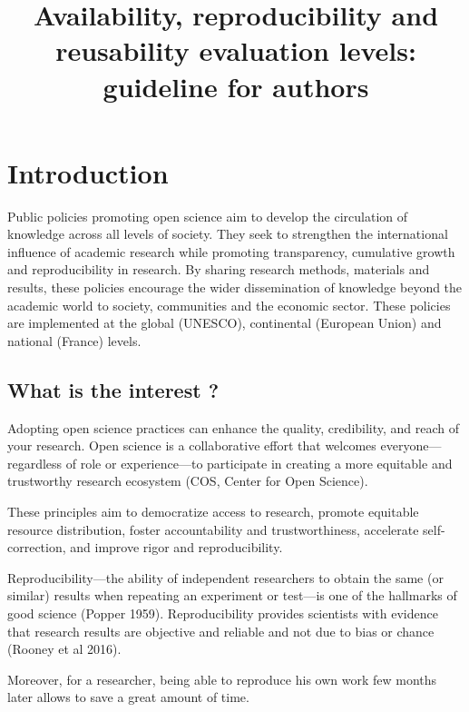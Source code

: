 \title{Availability, reproducibility and reusability evaluation levels: guideline for authors}

\section{Introduction}

Public policies promoting open science aim to develop the circulation of knowledge across all levels of society. They seek to strengthen the international influence of academic research while promoting transparency, cumulative growth and reproducibility in research. By sharing research methods, materials and results, these policies encourage the wider dissemination of knowledge beyond the academic world to society, communities and the economic sector. These policies are implemented at the global (UNESCO), continental (European Union) and national (France) levels.

\subsection{What is the interest ?}

Adopting open science practices can enhance the quality, credibility, and reach of your research. Open science is a collaborative effort that welcomes everyone—regardless of role or experience—to participate in creating a more equitable and trustworthy research ecosystem (COS, Center for Open Science). 

These principles aim to democratize access to research, promote equitable resource distribution, foster accountability and trustworthiness, accelerate self-correction, and improve rigor and reproducibility.

Reproducibility—the ability of independent researchers to obtain the same (or similar) results when repeating an experiment or test—is one of the hallmarks of good science (Popper 1959). Reproducibility provides scientists with evidence that research results are objective and reliable and not due to bias or chance (Rooney et al 2016).

Moreover, for a researcher, being able to reproduce his own work few months later allows to save a great amount of time.

